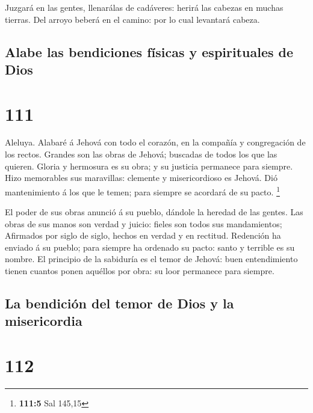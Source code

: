  Juzgará en las gentes, llenarálas de cadáveres: herirá las
cabezas en muchas tierras.  Del arroyo beberá en el camino:
por lo cual levantará cabeza.

\hypertarget{alabe-las-bendiciones-fuxedsicas-y-espirituales-de-dios}{%
\subsection{Alabe las bendiciones físicas y espirituales de
Dios}\label{alabe-las-bendiciones-fuxedsicas-y-espirituales-de-dios}}

\hypertarget{section-110}{%
\section{111}\label{section-110}}

 Aleluya. Alabaré á Jehová con todo el corazón, en la
compañía y congregación de los rectos.  Grandes son las
obras de Jehová; buscadas de todos los que las quieren. 
Gloria y hermosura es su obra; y su justicia permanece para siempre.
 Hizo memorables sus maravillas: clemente y misericordioso
es Jehová.  Dió mantenimiento á los que le temen; para
siempre se acordará de su pacto. \footnote{\textbf{111:5} Sal 145,15}

 El poder de sus obras anunció á su pueblo, dándole la
heredad de las gentes.  Las obras de sus manos son verdad y
juicio: fieles son todos sus mandamientos;  Afirmados por
siglo de siglo, hechos en verdad y en rectitud.  Redención
ha enviado á su pueblo; para siempre ha ordenado su pacto: santo y
terrible es su nombre.  El principio de la sabiduría es el
temor de Jehová: buen entendimiento tienen cuantos ponen aquéllos por
obra: su loor permanece para siempre.

\hypertarget{la-bendiciuxf3n-del-temor-de-dios-y-la-misericordia}{%
\subsection{La bendición del temor de Dios y la
misericordia}\label{la-bendiciuxf3n-del-temor-de-dios-y-la-misericordia}}

\hypertarget{section-111}{%
\section{112}\label{section-111}}

